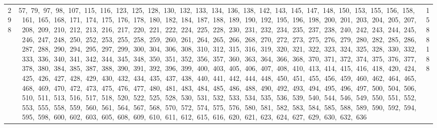 \begin{longtable}{c|p{}|r}
298 & 57,\ 79,\ 97,\ 98,\ 107,\ 115,\ 116,\ 123,\ 125,\ 128,\ 130,\ 132,\ 133,\ 134,\ 136,\ 138,\ 142,\ 143,\ 145,\ 147,\ 148,\ 150,\ 153,\ 155,\ 156,\ 158,\ 161,\ 165,\ 168,\ 171,\ 174,\ 175,\ 176,\ 178,\ 180,\ 182,\ 184,\ 187,\ 188,\ 189,\ 190,\ 192,\ 195,\ 196,\ 198,\ 200,\ 201,\ 203,\ 204,\ 205,\ 207,\ 208,\ 209,\ 210,\ 212,\ 213,\ 216,\ 217,\ 220,\ 221,\ 222,\ 224,\ 225,\ 228,\ 230,\ 231,\ 232,\ 234,\ 235,\ 237,\ 238,\ 240,\ 242,\ 243,\ 244,\ 245,\ 246,\ 247,\ 248,\ 250,\ 252,\ 253,\ 255,\ 258,\ 259,\ 260,\ 261,\ 264,\ 265,\ 266,\ 268,\ 270,\ 272,\ 273,\ 275,\ 276,\ 279,\ 280,\ 282,\ 285,\ 286,\ 287,\ 288,\ 290,\ 294,\ 295,\ 297,\ 299,\ 300,\ 304,\ 306,\ 308,\ 310,\ 312,\ 315,\ 316,\ 319,\ 320,\ 321,\ 322,\ 323,\ 324,\ 325,\ 328,\ 330,\ 332,\ 333,\ 336,\ 340,\ 341,\ 342,\ 344,\ 345,\ 348,\ 350,\ 351,\ 352,\ 356,\ 357,\ 360,\ 363,\ 364,\ 366,\ 368,\ 370,\ 371,\ 372,\ 374,\ 375,\ 376,\ 377,\ 378,\ 380,\ 384,\ 385,\ 387,\ 388,\ 390,\ 391,\ 392,\ 396,\ 399,\ 400,\ 403,\ 405,\ 406,\ 407,\ 408,\ 410,\ 413,\ 414,\ 415,\ 416,\ 418,\ 420,\ 424,\ 425,\ 426,\ 427,\ 428,\ 429,\ 430,\ 432,\ 434,\ 435,\ 437,\ 438,\ 440,\ 441,\ 442,\ 444,\ 448,\ 450,\ 451,\ 455,\ 456,\ 459,\ 460,\ 462,\ 464,\ 465,\ 468,\ 469,\ 470,\ 472,\ 473,\ 475,\ 476,\ 477,\ 480,\ 481,\ 483,\ 484,\ 485,\ 486,\ 488,\ 490,\ 492,\ 493,\ 494,\ 495,\ 496,\ 497,\ 500,\ 504,\ 506,\ 510,\ 511,\ 513,\ 516,\ 517,\ 518,\ 520,\ 522,\ 525,\ 528,\ 530,\ 531,\ 532,\ 533,\ 534,\ 535,\ 536,\ 539,\ 540,\ 544,\ 546,\ 549,\ 550,\ 551,\ 552,\ 553,\ 555,\ 558,\ 559,\ 560,\ 561,\ 564,\ 567,\ 568,\ 570,\ 572,\ 574,\ 575,\ 576,\ 580,\ 581,\ 582,\ 583,\ 584,\ 585,\ 588,\ 589,\ 590,\ 592,\ 594,\ 595,\ 598,\ 600,\ 602,\ 603,\ 605,\ 608,\ 609,\ 610,\ 611,\ 612,\ 615,\ 616,\ 620,\ 621,\ 623,\ 624,\ 627,\ 629,\ 630,\ 632,\ 636 & 1588188 \\

\end{longtable}
